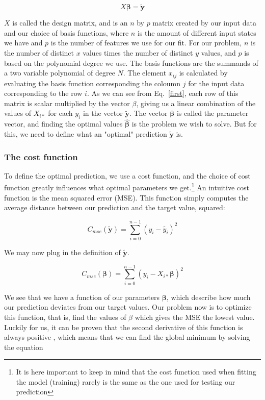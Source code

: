 \documentclass[twocolumn,10pt,cleanfoot]{asme2ej}
\begin{document}
\begin{equation}
X \bm{\beta} = \bm{\tilde{y}}
\label{first}
\end{equation}


$X$ is called the design matrix, and is an $n$ by $p$ matrix created by our input data and our choice of basis functions, where $n$ is the amount of different input states we have and $p$ is the number of features we use for our fit. For our problem, $n$ is the number of distinct $x$ values times the number of distinct $y$ values, and $p$ is based on the polynomial degree we use. The basis functions are the summands of a two variable polynomial of degree $N$. The element $x_{ij}$ is calculated by evaluating the basis function corresponding the coloumn $j$ for the input data corresponding to the row $i$. As we can see from Eq.~\ref{first}, each row of this matrix is scalar multiplied by the vector $\beta$, giving us a linear combination of the values of $X_{i*}$ for each $y_i$ in the vector $\bm{\tilde{y}}$. The vector $\bm{\beta}$ is called the parameter vector, and finding the optimal values $\hat{\bm{\beta}}$ is the problem we wish to solve. But for this, we need to define what an "optimal" prediction $\bm{\tilde{y}}$ is.

\subsubsection{The cost function}

To define the optimal prediction, we use a cost function, and the choice of cost function greatly influences what optimal parameters we get.\footnote{It is here important to keep in mind that the cost function used when fitting the model (training) rarely is the same as the one used for testing our prediction} An intuitive cost function is the mean squared error (MSE). This function simply computes the average distance between our prediction and the target value, squared:

\begin{equation}
	C_{mse}(\tilde{\bm{y}}) = \sum_{i=0}^{n-1}(y_i-\tilde{y_i})^2
\end{equation}

We may now plug in the definition of $\bm{\tilde{y}}$.

\begin{equation}
	C_{mse}(\bm{\beta}) = \sum_{i=0}^{n-1}(y_i-X_{i*}\bm{\beta})^2
\end{equation}

We see that we have a function of our parameters $\bm{\beta}$, which describe how much our prediction deviates from our target values. Our problem now is to optimize this function, that is, find the values of $\beta$ which gives the MSE the lowest value. Luckily for us, it can be proven that the second derivative of this function is always positive \cite[106]{linreg}, which means that we can find the global minimum by solving the equation
\end{document}
